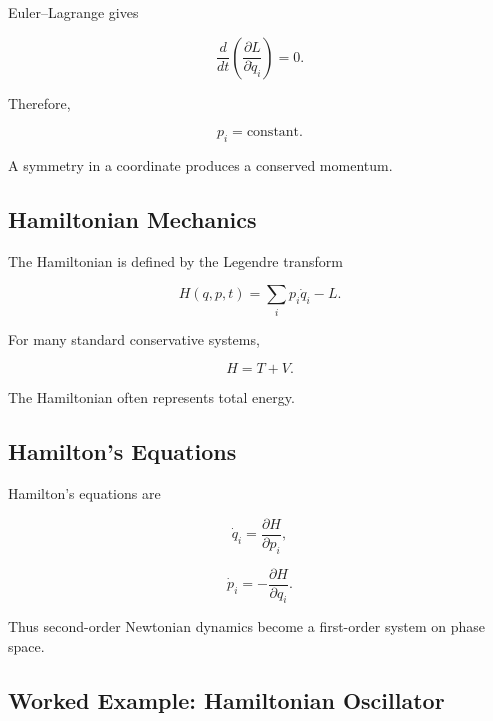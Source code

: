 Euler--Lagrange gives

\[
\frac{d}{dt}
\left(
\frac{\partial L}{\partial\dot q_i}
\right)
=
0.
\]

Therefore,

\[
\boxed{
p_i
=
\text{constant}.
}
\]

A symmetry in a coordinate produces a conserved momentum.

\subsection{Hamiltonian Mechanics}
\label{subsec:hamiltonian-mechanics}

The Hamiltonian is defined by the Legendre transform

\[
\boxed{
H(q,p,t)
=
\sum_i p_i\dot q_i
-
L.
}
\]

For many standard conservative systems,

\[
\boxed{
H=T+V.
}
\]

The Hamiltonian often represents total energy.

\subsection{Hamilton's Equations}
\label{subsec:hamiltons-equations}

Hamilton's equations are

\[
\boxed{
\dot q_i
=
\frac{\partial H}{\partial p_i},
}
\]

\[
\boxed{
\dot p_i
=
-\frac{\partial H}{\partial q_i}.
}
\]

Thus second-order Newtonian dynamics become a first-order system on phase
space.

\subsection{Worked Example: Hamiltonian Oscillator}
\label{subsec:worked-hamiltonian-oscillator}

